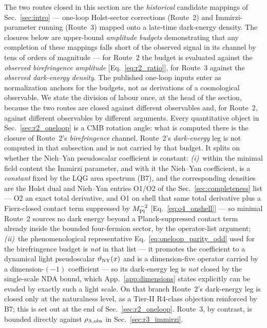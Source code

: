 \documentclass[aps,prd,twocolumn,superscriptaddress,showpacs,preprintnumbers,nofootinbib,longbibliography,floatfix]{revtex4-2}
\newcommand{\MPl}{M_{\rm Pl}}
\begin{document}
The two routes closed in this section are the \emph{historical} candidate
mappings of Sec.~\ref{sec:intro} --- one-loop Holst-sector corrections
(Route~2) and Immirzi-parameter running (Route~3) mapped onto a late-time
dark-energy density. The closures below are upper-bound
\emph{amplitude budgets} demonstrating that any completion of these
mappings falls short of the observed signal in its channel by tens of
orders of magnitude --- for Route~2 the budget is evaluated against the
\emph{observed birefringence amplitude} [Eq.~\eqref{eq:r2_ratio}], for
Route~3 against the \emph{observed dark-energy density}. The
published one-loop inputs enter as normalization anchors for the
budgets, not as derivations of a cosmological observable.
We state the division of labour once, at the head of the section, because
the two routes are closed against different observables and, for Route~2,
against different observables by different arguments. Every
quantitative object in Sec.~\ref{sec:r2_oneloop} is a CMB rotation angle:
what is computed there is the closure of Route~2's \emph{birefringence}
channel. Route~2's \emph{dark-energy} leg is not computed in that
subsection and is not carried by that budget. It splits on whether the
Nieh--Yan pseudoscalar coefficient is constant:
\emph{(i)}~within the minimal field content the Immirzi parameter, and
with it the Nieh--Yan coefficient, is a \emph{constant} fixed by the LQG
area spectrum (B7), and the corresponding densities are the Holst dual and
Nieh--Yan entries O1/O2 of the Sec.~\ref{sec:completeness} list --- O2 an
exact total derivative, and O1 on shell that same total derivative plus a
Fierz-closed contact term suppressed by $\MPl^{-2}$
[Eq.~\eqref{eq:o4_onshell}] --- so minimal Route~2 sources no dark energy
beyond a Planck-suppressed contact term already inside the bounded
four-fermion sector, by the operator-list argument;
\emph{(ii)}~the phenomenological representative
Eq.~\eqref{eq:oneloop_parity_odd} used for the birefringence budget is
\emph{not} in that list --- it promotes the coefficient to a dynamical
light pseudoscalar $\vartheta_{\rm NY}(x)$ and is a dimension-five
operator carried by a dimension-$(-1)$ coefficient --- so its dark-energy
leg is \emph{not} closed by the single-scale NDA bound, which
App.~\ref{app:dimensions} states explicitly can be evaded by exactly such
a light scale. On that branch Route~2's dark-energy leg is closed only at
the naturalness level, as a Tier-II R4-class objection reinforced by B7;
this is set out at the end of Sec.~\ref{sec:r2_oneloop}. Route~3, by
contrast, is bounded directly against $\rho_{\Lambda,\rm obs}$
in Sec.~\ref{sec:r3_immirzi}.
\end{document}
